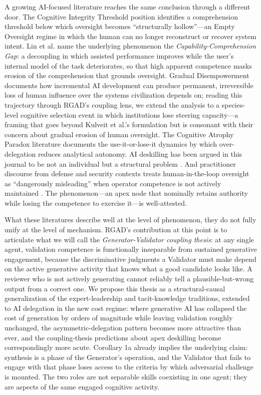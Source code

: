 \documentclass[11pt,a4paper]{article}
\begin{document}
A growing AI-focused literature reaches the same conclusion through a different door. The Cognitive Integrity Threshold position \citep{lin2026} identifies a comprehension threshold below which oversight becomes ``structurally hollow''---an Empty Oversight regime in which the human can no longer reconstruct or recover system intent. Lin et al. name the underlying phenomenon the \emph{Capability-Comprehension Gap}: a decoupling in which assisted performance improves while the user's internal model of the task deteriorates, so that high apparent competence masks erosion of the comprehension that grounds oversight. Gradual Disempowerment \citep{kulveit2025} documents how incremental AI development can produce permanent, irreversible loss of human influence over the systems civilization depends on; reading this trajectory through RGAD's coupling lens, we extend the analysis to a species-level cognitive selection event in which institutions lose steering capacity---a framing that goes beyond Kulveit et al.'s formulation but is consonant with their concern about gradual erosion of human oversight. The Cognitive Atrophy Paradox literature \citep{kabashkin2025} documents the use-it-or-lose-it dynamics by which over-delegation reduces analytical autonomy. AI deskilling has been argued in this journal to be not an individual but a structural problem \citep{ferdman2025}. And practitioner discourse from defense and security contexts treats human-in-the-loop oversight as ``dangerously misleading'' when operator competence is not actively maintained \citep{dickerson2026, hof2026}. The phenomenon---an apex node that nominally retains authority while losing the competence to exercise it---is well-attested.

What these literatures describe well at the level of phenomenon, they do not fully unify at the level of mechanism. RGAD's contribution at this point is to articulate what we will call the \emph{Generator-Validator coupling thesis}: at any single agent, validation competence is functionally inseparable from sustained generative engagement, because the discriminative judgments a Validator must make depend on the active generative activity that knows what a good candidate looks like. A reviewer who is not actively generating cannot reliably tell a plausible-but-wrong output from a correct one. We propose this thesis as a structural-causal generalization of the expert-leadership and tacit-knowledge traditions, extended to AI delegation in the new cost regime: where generative AI has collapsed the cost of generation by orders of magnitude while leaving validation roughly unchanged, the asymmetric-delegation pattern becomes more attractive than ever, and the coupling-thesis predictions about apex deskilling become correspondingly more acute. Corollary 1a already implies the underlying claim: synthesis is a phase of the Generator's operation, and the Validator that fails to engage with that phase loses access to the criteria by which adversarial challenge is mounted. The two roles are not separable skills coexisting in one agent; they are aspects of the same engaged cognitive activity.
\end{document}
